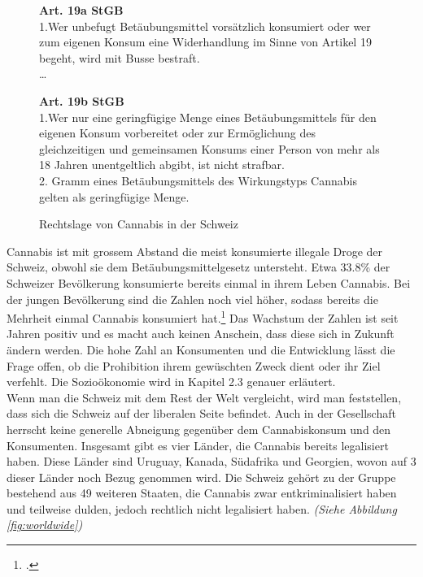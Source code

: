 \documentclass[../main.tex]{subfiles}
\begin{document}
	 \begin{figure}[H]
	 \begin{tcolorbox}
	 	\textbf{Art. 19a StGB}\\[7pt]
		1.\quad Wer unbefugt Betäubungsmittel vorsätzlich konsumiert oder wer zum eigenen Konsum eine Widerhandlung im Sinne von Artikel 19 begeht, wird mit Busse bestraft.\\[10pt]
		\ldots
	\end{tcolorbox}
	
	\begin{tcolorbox}
		\textbf{Art. 19b StGB}\\[7pt]
	 	1.\quad Wer nur eine geringfügige Menge eines Betäubungsmittels für den eigenen Konsum vorbereitet oder zur Ermöglichung des gleichzeitigen und gemeinsamen Konsums einer Person von mehr als 18 Jahren unentgeltlich abgibt, ist nicht strafbar.\\[10pt]
2. Gramm eines Betäubungsmittels des Wirkungstyps Cannabis gelten als geringfügige Menge.
	 \end{tcolorbox}
	 \captionsetup{font=small}
	 \caption{Rechtslage von Cannabis in der Schweiz}
	 \label{fig:stgb-art-19}
	 \end{figure}
	 
	 
	 \noindent
	 Cannabis ist mit grossem Abstand die meist konsumierte illegale Droge der Schweiz, obwohl sie dem Betäubungsmittelgesetz untersteht. 
	 Etwa 33.8\% der Schweizer Bevölkerung konsumierte bereits einmal in ihrem Leben Cannabis. 
	 Bei der jungen Bevölkerung sind die Zahlen noch viel höher, sodass bereits die Mehrheit einmal Cannabis konsumiert hat.\footcite{gmel} 
	 Das Wachstum der Zahlen ist seit Jahren positiv und es macht auch keinen Anschein, dass diese sich in Zukunft ändern werden.
	 Die hohe Zahl an Konsumenten und die Entwicklung lässt die Frage offen, ob die Prohibition ihrem gewüschten Zweck dient oder ihr Ziel verfehlt.
	 Die Sozioökonomie wird in Kapitel 2.3 genauer erläutert.\\
	 
	 \noindent
	 Wenn man die Schweiz mit dem Rest der Welt vergleicht, wird man feststellen, dass sich die Schweiz auf der liberalen Seite befindet.
	 Auch in der Gesellschaft herrscht keine generelle Abneigung gegenüber dem Cannabiskonsum und den Konsumenten.	
	 Insgesamt gibt es vier Länder, die Cannabis bereits legalisiert haben.
	 Diese Länder sind Uruguay, Kanada, Südafrika und Georgien, wovon auf 3 dieser Länder noch Bezug genommen wird.
	 Die Schweiz gehört zu der Gruppe bestehend aus 49 weiteren Staaten, die Cannabis zwar entkriminalisiert haben und teilweise dulden, jedoch rechtlich nicht legalisiert haben. \textit{(Siehe Abbildung \ref{fig:worldwide})}\\
	 
\end{document}
